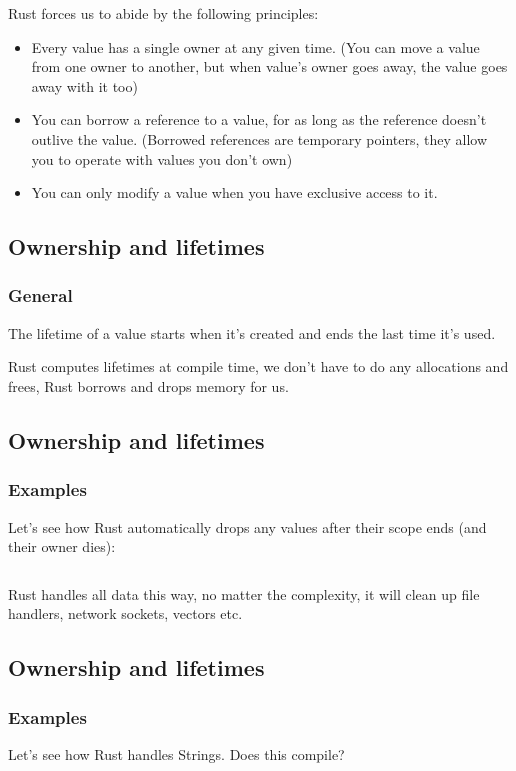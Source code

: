 \documentclass[usenames,twocolumn,dvipsnames,10pt,a4wide]{article}
\begin{document}
	
	Rust forces us to abide by the following principles:
	\begin{itemize}[label=$\bullet$]
		\item Every value has a single owner at any given time.
			(You can move a value from one owner to another, but when
			value's owner goes away, the value goes away with it too)
		\item You can borrow a reference to a value, for as long as
			the reference doesn't outlive the value.
			(Borrowed references are temporary pointers, they
			allow you to operate with values you don't own)
		\item You can only modify a value when you have exclusive
			access to it.
	\end{itemize}
	


\subsection{Ownership and lifetimes}
	\subsubsection{General}
	The lifetime of a value starts when it’s created
	and ends the last time it’s used.
	
	Rust computes lifetimes at compile time, we don't
	have to do any allocations and frees, Rust borrows
	and drops memory for us.


\subsection{Ownership and lifetimes}
	\subsubsection{Examples}
	Let's see how Rust automatically drops any values after
	their scope ends (and their owner dies):
	
	\inputminted[fontsize=\normalsize]{rust}{code/own1.rs}
	
	Rust handles all data this way, no matter the complexity,
	it will clean up file handlers, network sockets, vectors etc.


\subsection{Ownership and lifetimes}
	\subsubsection{Examples}
	Let's see how Rust handles Strings. Does this compile?
	
\end{document}
